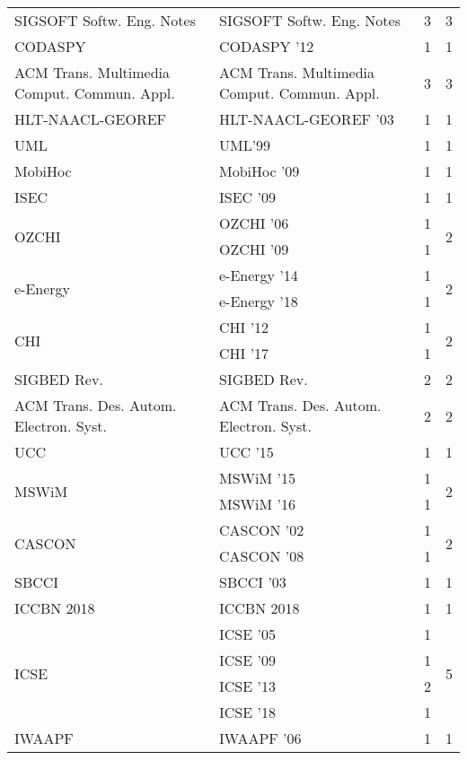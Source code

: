 \begin{table*}[t]
\begin{tabular}{llrr}
\multirow{1}{*}{SIGSOFT Softw. Eng. Notes} & SIGSOFT Softw. Eng. Notes & 3 & \multirow{1}{*}{3}\\
\multirow{1}{*}{CODASPY } & CODASPY '12 & 1 & \multirow{1}{*}{1}\\
\multirow{1}{*}{ACM Trans. Multimedia Comput. Commun. Appl.} & ACM Trans. Multimedia Comput. Commun. Appl. & 3 & \multirow{1}{*}{3}\\
\multirow{1}{*}{HLT-NAACL-GEOREF } & HLT-NAACL-GEOREF '03 & 1 & \multirow{1}{*}{1}\\
\multirow{1}{*}{UML} & UML'99 & 1 & \multirow{1}{*}{1}\\
\multirow{1}{*}{MobiHoc } & MobiHoc '09 & 1 & \multirow{1}{*}{1}\\
\multirow{1}{*}{ISEC } & ISEC '09 & 1 & \multirow{1}{*}{1}\\
\multirow{2}{*}{OZCHI } & OZCHI '06 & 1 & \multirow{2}{*}{2}\\
& OZCHI '09 & 1 &\\
\multirow{2}{*}{e-Energy } & e-Energy '14 & 1 & \multirow{2}{*}{2}\\
& e-Energy '18 & 1 &\\
\multirow{2}{*}{CHI } & CHI '12 & 1 & \multirow{2}{*}{2}\\
& CHI '17 & 1 &\\
\multirow{1}{*}{SIGBED Rev.} & SIGBED Rev. & 2 & \multirow{1}{*}{2}\\
\multirow{1}{*}{ACM Trans. Des. Autom. Electron. Syst.} & ACM Trans. Des. Autom. Electron. Syst. & 2 & \multirow{1}{*}{2}\\
\multirow{1}{*}{UCC } & UCC '15 & 1 & \multirow{1}{*}{1}\\
\multirow{2}{*}{MSWiM } & MSWiM '15 & 1 & \multirow{2}{*}{2}\\
& MSWiM '16 & 1 &\\
\multirow{2}{*}{CASCON } & CASCON '02 & 1 & \multirow{2}{*}{2}\\
& CASCON '08 & 1 &\\
\multirow{1}{*}{SBCCI } & SBCCI '03 & 1 & \multirow{1}{*}{1}\\
\multirow{1}{*}{ICCBN 2018} & ICCBN 2018 & 1 & \multirow{1}{*}{1}\\
\multirow{4}{*}{ICSE } & ICSE '05 & 1 & \multirow{4}{*}{5}\\
& ICSE '09 & 1 &\\
& ICSE '13 & 2 &\\
& ICSE '18 & 1 &\\
\multirow{1}{*}{IWAAPF } & IWAAPF '06 & 1 & \multirow{1}{*}{1}\\

\end{tabular}
\end{table*}
